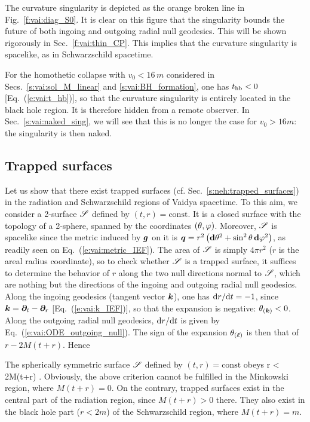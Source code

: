 The curvature singularity is depicted as the orange broken line in Fig.~\ref{f:vai:diag_S0}.
It is clear on this figure that the singularity bounds the future of both ingoing and outgoing radial null geodesics.
This will be shown rigorously in Sec.~\ref{f:vai:thin_CP}.
This implies that the curvature singularity is spacelike, as in Schwarzschild spacetime.

For the homothetic collapse with $v_0 < 16\, m$ considered in Secs.~\ref{s:vai:sol_M_linear} and
\ref{s:vai:BH_formation}, one has $t_{\rm hb} < 0$ [Eq.~(\ref{e:vai:t_hb})], so that
the curvature singularity is entirely located in the black hole region. It is therefore hidden
from a remote observer. In Sec.~\ref{s:vai:naked_sing}, we will see that this is no longer the
case for $v_0 > 16 m$: the singularity is then naked.

\subsection{Trapped surfaces} \label{s:vai:trapped_surf}

Let us show that there exist trapped surfaces (cf. Sec.~\ref{s:neh:trapped_surfaces}) in the
radiation and Schwarzschild regions of Vaidya spacetime.
To this aim, we consider a 2-surface $\mathscr{S}$ defined by $(t,r) = \mathrm{const}$. It is a closed surface
with the topology of a 2-sphere, spanned by the coordinates $(\theta,\varphi)$.
Moreover, $\mathscr{S}$ is spacelike since the metric induced by $\bm{g}$ on it  is
$\bm{q} = r^2 \left( \mathbf{d}\theta^2 + \sin^2\theta\, \mathbf{d}\varphi^2 \right) $, as readily seen
on Eq.~(\ref{e:vai:metric_IEF}). The area of $\mathscr{S}$ is simply $4\pi r^2$
($r$ is the areal radius coordinate), so to check whether $\mathscr{S}$ is a trapped surface,
it suffices to determine the behavior
of $r$ along the two null directions normal to $\mathscr{S}$, which are nothing but
the directions of the ingoing and outgoing radial null geodesics.
Along the ingoing geodesics (tangent vector $\bm{k}$),
one has $\mathrm{d} r / \mathrm{d} t = - 1$, since $\bm{k} = \bm{\partial}_t - \bm{\partial}_r$ [Eq.~(\ref{e:vai:k_IEF})],
so that the expansion is negative: $\theta_{(\bm{k})} < 0$.
Along the outgoing radial null geodesics, $\mathrm{d} r / \mathrm{d} t$ is given by Eq.~(\ref{e:vai:ODE_outgoing_null}).
The sign of the expansion $\theta_{(\bm{\ell})}$ is then that of $r - 2M(t+r)$. Hence
\begin{greybox}
The spherically symmetric surface $\mathscr{S}$ defined by $(t,r) = \mathrm{const}$ obeys
\be \label{e:vai:S_trapped}
    \Sp {} \iff r < 2M(t+r) .
\ee
Obviously, the above criterion cannot be fulfilled in the Minkowski region, where $M(t+r) = 0$.
On the contrary, trapped surfaces exist
in the central part of the radiation region, since $M(t+r) > 0$ there.
They also exist in the black hole part ($r < 2m$)
of the Schwarzschild region, where
$M(t+r) = m$.
\end{greybox}


